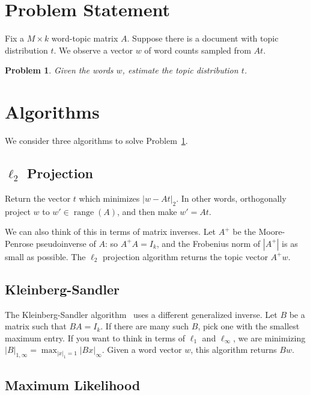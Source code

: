\documentclass{article}
\DeclareMathOperator{\Range}{range}
\newtheorem{Problem}{Problem}
\begin{document}
\section{Problem Statement}

Fix a \(M \times k\) word-topic matrix \(A\).
Suppose there is a document with topic distribution \(t\).
We observe a vector \(w\) of word counts sampled from \(At\).
\begin{Problem}
    \label{Problem:InferTopics}
    Given the words \(w\), estimate the topic distribution \(t\).
\end{Problem}

\section{Algorithms}

We consider three algorithms to solve Problem~\ref{Problem:InferTopics}.

\subsection{\(\ell_2\) Projection}

Return the vector \(t\) which minimizes \(|w - A t|_2\).
In other words, orthogonally project \(w\) to \(w' \in \Range(A)\), and then make \(w' = A t\).

We can also think of this in terms of matrix inverses.
Let \(A^+\) be the Moore-Penrose pseudoinverse of \(A\): so \(A^+A = I_k\), and the Frobenius norm of \(|A^+|\) is as small as possible.
The \(\ell_2\) projection algorithm returns the topic vector \(A^+w\).

\subsection{Kleinberg-Sandler}

The Kleinberg-Sandler algorithm~\cite{kleinberg2004using} uses a different generalized inverse.
Let \(B\) be a matrix such that \(BA = I_k\).
If there are many such \(B\), pick one with the smallest maximum entry.
If you want to think in terms of \(\ell_1\) and \(\ell_\infty\), we are minimizing \(|B|_{1,\infty} = \max_{|x|_1 = 1} |B x|_\infty\).
Given a word vector \(w\), this algorithm returns \(Bw\).

\subsection{Maximum Likelihood}
\end{document}

